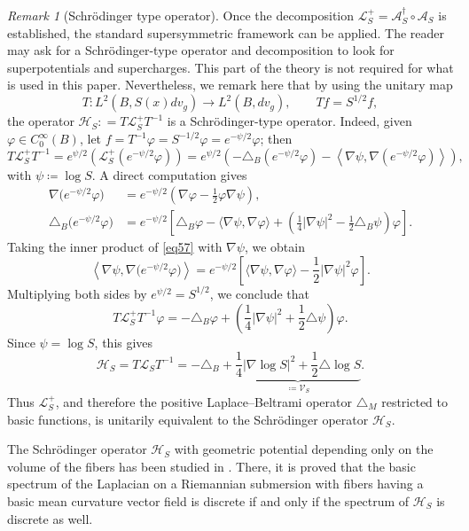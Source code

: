 \documentclass{amsart}
\theoremstyle{definition}
\theoremstyle{remark}
\newtheorem{remark}[theorem]{Remark}
\numberwithin{equation}{section}
\begin{document}
\begin{remark}[Schrödinger type operator]
Once the decomposition $\mathscr{L}_S^+=\mathcal{A}_S^\dag\circ \mathcal{A}_S$ is established, the standard supersymmetric framework can be applied. The reader may ask for a Schr\"{o}dinger-type operator and decomposition to look for superpotentials and supercharges. This part of the theory is not required for what is used in this paper. Nevertheless, we remark here that by using the unitary map
\[
T\colon L^2(B,S(x)dv_{g})\longrightarrow L^2(B,dv_{g}),
\qquad Tf=S^{1/2}f,
\]
the operator $\mathscr{H}_S: =T\mathscr L_S^+T^{-1}$ is a Schr\"{o}dinger-type operator. Indeed, given $\varphi\in C_0^\infty(B)$, let $f=T^{-1}\varphi=S^{-1/2}\varphi=e^{-\psi/2}\varphi$; then
\[
T\mathscr L^+_ST^{-1}=e^{\psi/2}(\mathscr L_S^{+}(e^{-\psi/2}\varphi)) =e^{\psi/2}\left( -\triangle_B(e^{-\psi/2}\varphi)
-\left\langle \nabla\psi,\nabla(e^{-\psi/2}\varphi) \right\rangle\right),
\]
with $\psi \coloneq \log S$. A direct computation gives
\begin{align}
\nabla\bigl(e^{-\psi/2}\varphi\bigr)
&=
e^{-\psi/2}
\left(
\nabla\varphi-\frac12\varphi\nabla\psi
\right), \label{eq57}\\
\triangle_B\bigl(e^{-\psi/2}\varphi\bigr)
&=
e^{-\psi/2}
\left[ \triangle_B\varphi - \langle\nabla\psi,\nabla\varphi\rangle
+ \left( \frac14|\nabla\psi|^2 - \frac{1}{2}\triangle_B \psi \right)\varphi
\right]. \label{eq58}
\end{align}
Taking the inner product of \eqref{eq57} with $\nabla\psi$, we obtain
\[
\left\langle \nabla\psi,\nabla\bigl(e^{-\psi/2}\varphi\bigr) \right\rangle
= e^{-\psi/2} \left[ \langle\nabla\psi,\nabla\varphi\rangle -
\frac{1}{2}|\nabla\psi|^2\varphi
\right].
\]
Multiplying both sides by \(e^{\psi/2}=S^{1/2}\), we conclude that
\[
T\mathscr L_S^+T^{-1}\varphi = -\triangle_B\varphi + \left(
\frac{1}{4}|\nabla\psi|^2 +\frac{1}{2}\triangle\psi
\right)\varphi.
\]
Since $\psi=\log S$, this gives
\begin{equation}\label{SDcorres}
\mathscr{H}_S=T\mathscr L_ST^{-1} = - \triangle_{B} +\underbrace{\frac{1}{4}|\nabla\log S|^2
+\frac{1}{2}\triangle\log S}_{ \coloneqq  \mathcal{V}_S}.
    \end{equation}
Thus $\mathscr L^+_S$, and therefore the positive Laplace--Beltrami
operator $\triangle_M$ restricted to basic functions, is unitarily
equivalent to the Schr\"{o}dinger operator \(\mathscr H_S\). 

The Schr\"{o}dinger operator $\mathscr{H}_S$ with geometric potential depending only on the volume of the fibers has been studied in \cite{Polymerakis2021}. There, it is proved that the basic spectrum of the Laplacian on a Riemannian submersion with fibers having a basic mean curvature vector field is discrete if and only if the spectrum of $\mathscr{H}_S$ is discrete as well.
\end{remark}
\end{document}
